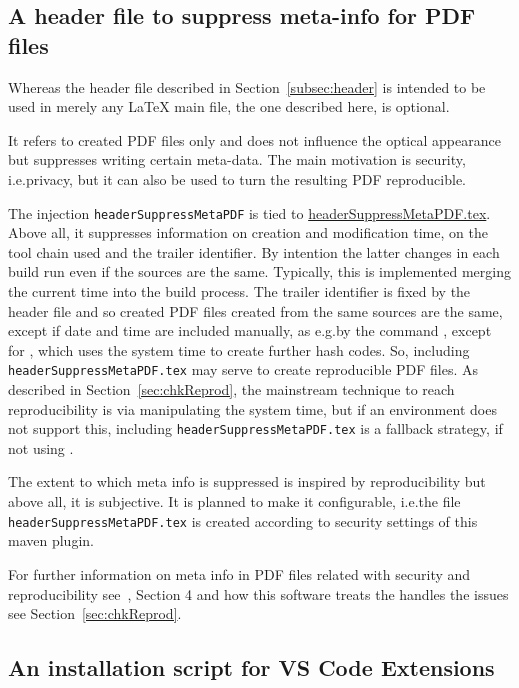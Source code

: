 \subsection{A header file to suppress meta-info for PDF files }\label{subsec:headerSuppressMetaPDF}

Whereas the header file described in Section~\ref{subsec:header} is intended to be used 
in merely any \LaTeX{} main file, 
the one described here, is optional. 

It refers to created PDF files only and does not influence the optical appearance 
but suppresses writing certain meta-data. 
The main motivation is security, i.e.\@ privacy, 
but it can also be used to turn the resulting PDF reproducible. 

The injection \texttt{headerSuppressMetaPDF} 
is tied to \href{\urlSite fromTex/headerSuppressMetaPDF.tex}{headerSuppressMetaPDF.tex}. 
Above all, it suppresses information on creation and modification time, on the tool chain used 
and the trailer identifier. 
By intention the latter changes in each build run even if the sources are the same. 
Typically, this is implemented merging the current time into the build process. 
The trailer identifier is fixed by the header file 
and so created PDF files created from the same sources are the same, 
except if date and time are included manually, as e.g.\@ by the command , 
except for \xelatex, which uses the system time to create further hash codes. 
So, including \texttt{headerSuppressMetaPDF.tex} may serve to create reproducible PDF files. 
As described in Section~\ref{sec:chkReprod}, 
the mainstream technique to reach reproducibility 
is via manipulating the system time, 
but if an environment does not support this, 
including \texttt{headerSuppressMetaPDF.tex} is a fallback strategy, 
if not using \xelatex. 

The extent to which meta info is suppressed is inspired by reproducibility 
but above all, it is subjective. 
It is planned to make it configurable, 
i.e.\@ the file \texttt{headerSuppressMetaPDF.tex} 
is created according to security settings of this maven plugin. 

For further information on meta info in PDF files 
related with security and reproducibility 
see~\cite{LatexGen}, Section 4 
and how this software treats the handles the issues 
see Section~\ref{sec:chkReprod}. 


\subsection{An installation script for VS Code Extensions }\label{subsec:instExtVsCode}

